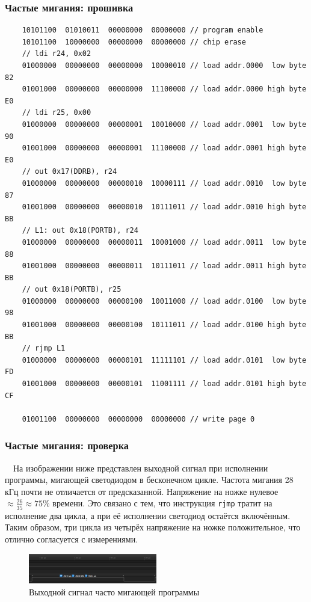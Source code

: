 \documentclass[aspectratio=169, pdf, 8pt, unicode]{beamer}
\begin{document}
\begin{frame}[fragile]
\frametitle{Частые мигания: прошивка}
\small
	\begin{verbatim}
    10101100  01010011  00000000  00000000 // program enable
    10101100  10000000  00000000  00000000 // chip erase
    // ldi r24, 0x02
    01000000  00000000  00000000  10000010 // load addr.0000  low byte 82
    01001000  00000000  00000000  11100000 // load addr.0000 high byte E0
    // ldi r25, 0x00
    01000000  00000000  00000001  10010000 // load addr.0001  low byte 90
    01001000  00000000  00000001  11100000 // load addr.0001 high byte E0
    // out 0x17(DDRB), r24
    01000000  00000000  00000010  10000111 // load addr.0010  low byte 87
    01001000  00000000  00000010  10111011 // load addr.0010 high byte BB
    // L1: out 0x18(PORTB), r24
    01000000  00000000  00000011  10001000 // load addr.0011  low byte 88
    01001000  00000000  00000011  10111011 // load addr.0011 high byte BB
    // out 0x18(PORTB), r25
    01000000  00000000  00000100  10011000 // load addr.0100  low byte 98
    01001000  00000000  00000100  10111011 // load addr.0100 high byte BB
    // rjmp L1
    01000000  00000000  00000101  11111101 // load addr.0101  low byte FD
    01001000  00000000  00000101  11001111 // load addr.0101 high byte CF

    01001100  00000000  00000000  00000000 // write page 0
	\end{verbatim}
\end{frame}

\begin{frame}[fragile]
\frametitle{Частые мигания: проверка}
	{ \large
	  \ \ На изображении ниже представлен выходной сигнал при исполнении программы, мигающей светодиодом в бесконечном цикле.
	  Частота мигания 28 кГц почти не отличается от предсказанной. Напряжение на ножке
	  нулевое $\approx \frac{26}{35} \approx 75\%$ времени. Это связано с тем, что инструкция
	  \texttt{rjmp} тратит на исполнение два цикла, а при её исполнении светодиод остаётся включённым.
	  Таким образом, три цикла из четырёх напряжение на ножке положительное, что отлично согласуется
	  с измерениями.
	}
	\begin{figure}[H]
		\centering
		\includegraphics[width=0.5\textwidth]{resources/logic_fast_blinking.png}
		\caption{Выходной сигнал часто мигающей программы}
	\end{figure}
\end{frame}
\end{document}
